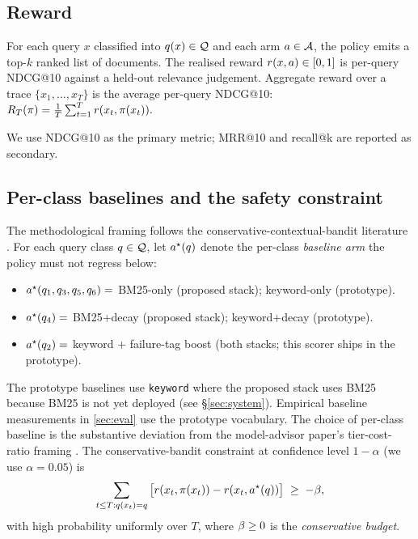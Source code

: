 \subsection{Reward}

For each query $x$ classified into $q(x) \in \mathcal{Q}$ and
each arm $a \in \mathcal{A}$, the policy emits a top-$k$ ranked list of
documents. The realised reward $r(x, a) \in [0, 1]$ is per-query
NDCG@10 against a held-out relevance judgement. Aggregate reward over a
trace $\{x_1, \ldots, x_T\}$ is the average per-query NDCG@10:
\(
  R_T(\pi) = \tfrac{1}{T} \sum_{t=1}^T r(x_t, \pi(x_t)).
\)

We use NDCG@10 as the primary metric; MRR@10 and recall@k are reported as
secondary. 

\subsection{Per-class baselines and the safety constraint}

The methodological framing follows the conservative-contextual-bandit
literature \cite{wu2016conservative,kazerouni2017conservative}. For each
query class $q \in \mathcal{Q}$, let $a^\star(q)$
denote the per-class \emph{baseline arm} the policy must not regress
below:

\begin{itemize}[leftmargin=*]
  \item $a^\star(q_1, q_3, q_5, q_6) = $
        BM25-only (proposed stack); keyword-only (prototype).
  \item $a^\star(q_4) = $ BM25+decay (proposed stack);
        keyword+decay (prototype).
  \item $a^\star(q_2) = $ keyword + failure-tag boost
        (both stacks; this scorer ships in the prototype).
\end{itemize}

The prototype baselines use \texttt{keyword} where the proposed stack
uses BM25 because BM25 is not yet deployed (see \S\ref{sec:system}).
Empirical baseline measurements in \cref{sec:eval} use the prototype
vocabulary.  The choice of per-class baseline is the substantive
deviation from the model-advisor paper's tier-cost-ratio framing
\cite{blackrim_moa1c}. The conservative-bandit constraint at confidence
level $1 - \alpha$ (we use $\alpha = 0.05$) is
\begin{equation}
  \sum_{t \le T : q(x_t) = q}
    \big[r(x_t, \pi(x_t)) - r(x_t, a^\star(q))\big]
  \;\geq\; -\beta,
  \label{eq:conservative-budget}
\end{equation}
with high probability uniformly over $T$, where $\beta \geq 0$ is the
\emph{conservative budget}. 

